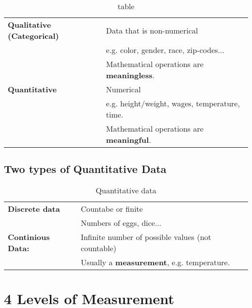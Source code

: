 \begin{table}[htbp]
    \centering
    \begin{tabular}{>{\bfseries}l l}
        \toprule
        Qualitative (Categorical) & Data that is non-numerical \\
                                  & e.g. color, gender, race, zip-codes...\\
                                  & Mathematical operations are \textbf{meaningless}.\\
        \midrule
        Quantitative & Numerical \\
                     & e.g. height/weight, wages, temperature, time.  \\
                     & Mathematical operations are \textbf{meaningful}.  \\
        \bottomrule
    \end{tabular}
    \caption{table}
    \label{tab:vocab-3}
\end{table}

\clearpage


\subsection{Two types of Quantitative Data}

\begin{table}[htbp]
    \centering
    \begin{tabular}{>{\bfseries}l l}
        \toprule
        Discrete data & Countabe or finite \\
                      & Numbers of eggs, dice... \\
                      \midrule
        Continious Data: & Infinite number of possible values (not countable) \\
                         & Usually a \textbf{measurement}, e.g. temperature. \\
                         \bottomrule
    \end{tabular}
    \caption{Quantitative data}
    \label{tab:vocab-4}
\end{table}

\section{4 Levels of Measurement}

